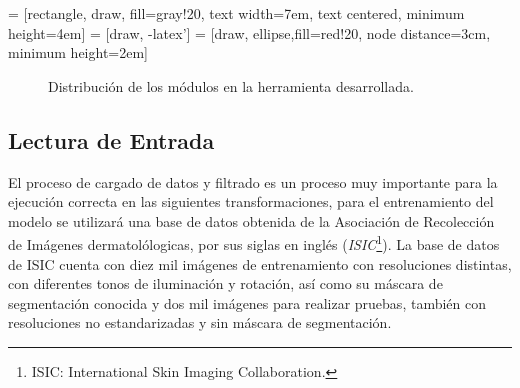  = [rectangle, draw, fill=gray!20, 
    text width=7em, text centered, minimum height=4em]
 = [draw, -latex']
 = [draw, ellipse,fill=red!20, node distance=3cm,
    minimum height=2em]

\begin{figure}[H]
    \centering
    \caption{Distribución de los módulos en la herramienta desarrollada.}
    \label{fig: modules}
\end{figure}

\subsection{Lectura de Entrada}
El proceso de cargado de datos y filtrado es un proceso muy importante para la ejecución correcta en las siguientes transformaciones, para el entrenamiento del modelo se utilizará una base de datos obtenida de la Asociación de Recolección de Imágenes dermatolólogicas, por sus siglas en inglés (\emph{ISIC}\footnote{ISIC: International Skin Imaging Collaboration.}). La base de datos de ISIC cuenta con diez mil imágenes de entrenamiento con resoluciones distintas, con diferentes tonos de iluminación y rotación, así como su máscara de segmentación conocida y dos mil imágenes para realizar pruebas, también con resoluciones no estandarizadas y sin máscara de segmentación.


